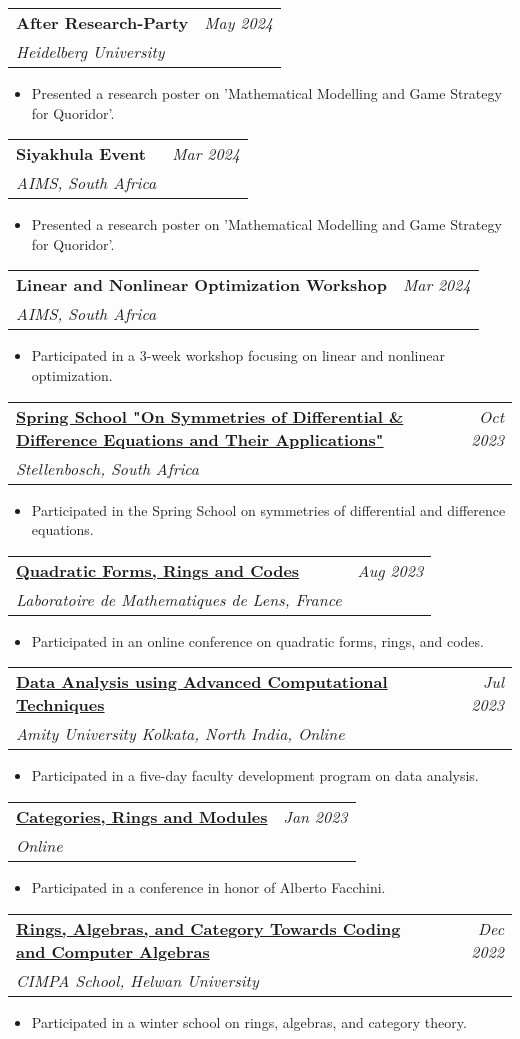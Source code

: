 \documentclass[a4paper,11pt]{article}
\makeatletter
\newcommand{\resumeProject}[4]{
\vspace{0.5mm}\item
    \begin{tabular*}{0.98\textwidth}[t]{l@{\extracolsep{\fill}}r}
        \textbf{#1} & \textit{\footnotesize{#3}} \\
        \footnotesize{\textit{#2}} & \footnotesize{#4}
    \end{tabular*}
    \vspace{-2.4mm}
}
\newcommand{\resumeItemListStart}{\begin{itemize}[leftmargin=*,labelsep=1mm,itemsep=0.5mm]}
\newcommand{\resumeItemListEnd}{\end{itemize}\vspace{-2mm}}
\makeatother
\begin{document}
\resumeProject
{After Research-Party}{Heidelberg University}{May 2024}{}
\resumeItemListStart
\item Presented a research poster on 'Mathematical Modelling and Game Strategy for Quoridor'.
\resumeItemListEnd

\resumeProject
{Siyakhula Event}{AIMS, South Africa}{Mar 2024}{}
\resumeItemListStart
\item Presented a research poster on 'Mathematical Modelling and Game Strategy for Quoridor'.
\resumeItemListEnd

\resumeProject
{Linear and Nonlinear Optimization Workshop}{AIMS, South Africa}{Mar 2024}{}
\resumeItemListStart
\item Participated in a 3-week workshop focusing on linear and nonlinear optimization.
\resumeItemListEnd

\resumeProject
{\href{https://sites.google.com/view/spring-school-stellenbosch/registration?authuser=0}{Spring School "On Symmetries of Differential \& Difference Equations and Their Applications"}}{Stellenbosch, South Africa}{Oct 2023}{}
\resumeItemListStart
\item Participated in the Spring School on symmetries of differential and difference equations.
\resumeItemListEnd

\resumeProject
{\href{http://leroy.perso.math.cnrs.fr/QFRC2023/QFRC-2023.html}{Quadratic Forms, Rings and Codes}}{Laboratoire de Mathematiques de Lens, France}{Aug 2023}{}
\resumeItemListStart
\item Participated in an online conference on quadratic forms, rings, and codes.
\resumeItemListEnd

\resumeProject
{\href{https://drive.google.com/file/d/11xDh7Ywfn-CQ1OC37PS1ca1zWv8duHSZ/view}{Data Analysis using Advanced Computational Techniques}}{Amity University Kolkata, North India, Online}{Jul 2023}{}
\resumeItemListStart
\item Participated in a five-day faculty development program on data analysis.
\resumeItemListEnd

\resumeProject
{\href{https://events.math.unipd.it/CRaM/home}{Categories, Rings and Modules}}{Online}{Jan 2023}{}
\resumeItemListStart
\item Participated in a conference in honor of Alberto Facchini.
\resumeItemListEnd

\resumeProject
{\href{https://sites.google.com/view/algebra-winter-school}{Rings, Algebras, and Category Towards Coding and Computer Algebras}}{CIMPA School, Helwan University}{Dec 2022}{}
\resumeItemListStart
\item Participated in a winter school on rings, algebras, and category theory.
\resumeItemListEnd
\end{document}
